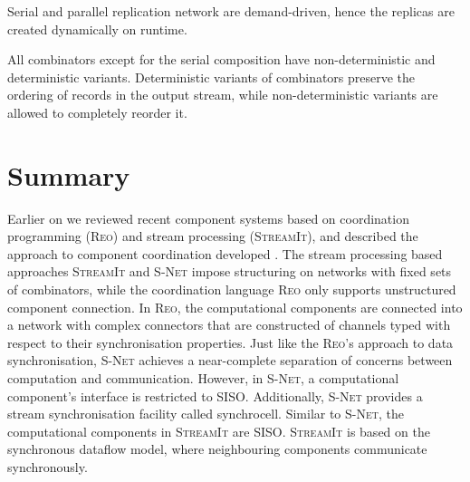 Serial and parallel replication network are demand-driven, hence the replicas are created dynamically on runtime.

All combinators except for the serial composition have non-deterministic and deterministic variants. Deterministic variants of combinators preserve the ordering of records in the output stream, while non-deterministic variants are allowed to completely reorder it.


    \section{Summary}
Earlier on we reviewed recent component systems based on coordination programming (\textsc{Reo}) and stream processing (\textsc{StreamIt}), and described the approach to component coordination developed . The stream processing based approaches \textsc{StreamIt} and \textsc{S-Net} impose structuring on networks with fixed sets of combinators, while the coordination language \textsc{Reo} only supports unstructured component connection. In \textsc{Reo}, the computational components are connected into a network with complex connectors that are constructed of channels typed with respect to their synchronisation properties. Just like the \textsc{Reo}'s approach to data synchronisation, \textsc{S-Net} achieves a near-complete separation of concerns between computation and communication. However, in \textsc{S-Net}, a computational component's interface is restricted to SISO. Additionally, \textsc{S-Net} provides a stream synchronisation facility called synchrocell. Similar to \textsc{S-Net}, the computational components in \textsc{StreamIt} are SISO. \textsc{StreamIt} is based on the synchronous dataflow model, where neighbouring components communicate synchronously.

